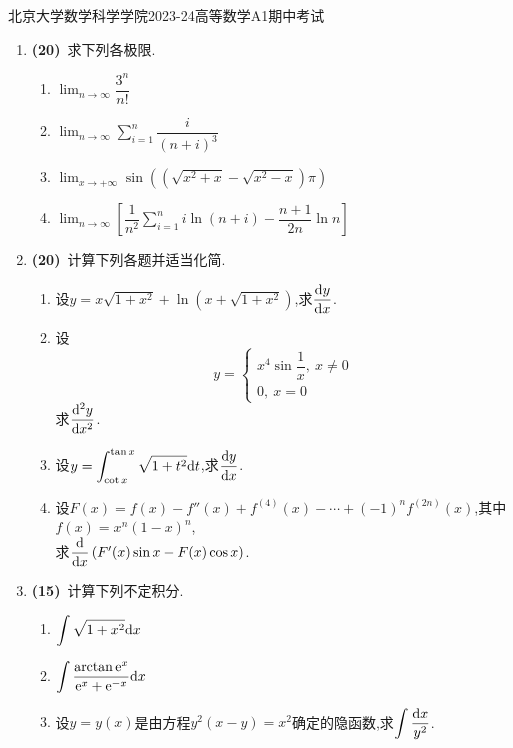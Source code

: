\documentclass{ctexart}
\begin{document}
\pagestyle{empty}
\begin{center}\Large
    北京大学数学科学学院2023-24高等数学A1期中考试
\end{center}
\begin{enumerate}[leftmargin=*,label=\textbf{\arabic*.},topsep=0pt,parsep=0pt,itemsep=0pt,partopsep=0pt]
    \item \textbf{(20)}\ 求下列各极限.
    \begin{enumerate}[label=\textbf{(\arabic*)}]
        \item $\displaystyle\lim_{n\to\infty}{\dfrac{3^n}{n!}}$
        \item $\displaystyle\lim_{n\to\infty}{\sum_{i=1}^{n}{\dfrac{i}{(n+i)^3}}}$
        \item $\displaystyle\lim_{x\to+\infty}{\sin\left(\left(\sqrt{x^2+x}-\sqrt{x^2-x}\right)\pi\right)}$
        \item $\displaystyle\lim_{n\to\infty}\left[\dfrac{1}{n^2}\sum_{i=1}^{n}i\ln(n+i)-\dfrac{n+1}{2n}\ln{n}\right]$
    \end{enumerate}

    \item \textbf{(20)}\ 计算下列各题并适当化简.
    \begin{enumerate}[label=\textbf{(\arabic*)}]
        \item 设$y=x\sqrt{1+x^2}+\ln{\left(x+\sqrt{1+x^2}\right)}$,求$\dfrac{\mathrm{d} y}{\mathrm{d} x}$.
        \item 设
            $$y=\left\{
                \begin{array}{l}
                    x^4\sin{\dfrac{1}{x}},\ x\neq 0 \\
                    0,\ x=0
                \end{array}
                \right.$$
            求$\dfrac{\mathrm{d}^2 y}{\mathrm{d} x^2}$.
        \item 设$\displaystyle y=\int_{\cot x}^{\tan x}\sqrt{1+t^2}\mathrm{d} t$,求$\dfrac{\mathrm{d} y}{\mathrm{d} x}$.
        \item 设$F(x)=f(x)-f''(x)+f^{(4)}(x)-\cdots+(-1)^{n}f^{(2n)}(x)$,其中$f(x)=x^n(1-x)^n$,
            \\求$\dfrac{\mathrm{d}}{\mathrm{d} x}\left(F'(x)\sin x-F(x)\cos x\right)$.
    \end{enumerate}

    \item \textbf{(15)}\ 计算下列不定积分.
        \begin{enumerate}[label=\textbf{(\arabic*)}]
            \item $\displaystyle\int\sqrt{1+x^2}\mathrm{d} x$
            \item $\displaystyle\int\dfrac{\arctan \mathrm{e}^x}{\mathrm{e}^x+\mathrm{e}^{-x}}\mathrm{d} x$
            \item 设$y=y(x)$是由方程$y^2(x-y)=x^2$确定的隐函数,求$\displaystyle\int{\dfrac{\mathrm{d}x}{y^2}}$.
        \end{enumerate}


\end{enumerate}
\end{document}
